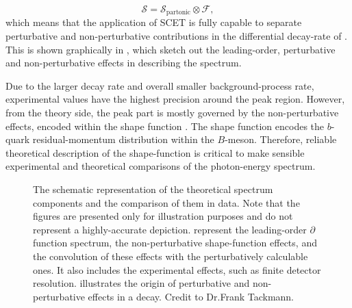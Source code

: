 \begin{equation}\label{eq:factorisation}
    \mathcal{S} = \mathcal{S}_{\mathrm{partonic}} \otimes \mathcal{F},
\end{equation}
which means that the application of SCET is fully capable to separate perturbative and non-perturbative contributions in the differential decay-rate of \BtoXsgamma.
This is shown graphically in , which sketch out the leading-order, perturbative and non-perturbative effects in describing the \BtoXsgamma spectrum.

Due to the larger \BtoXsgamma decay rate and overall smaller background-process rate, experimental values have the highest precision around the peak region.
However, from the theory side, the peak part is mostly governed by the non-perturbative effects, encoded within the shape function \cite{Ligeti:2008ac}.
The shape function encodes the $b$-quark residual-momentum distribution within the $B$-meson. 
Therefore, reliable theoretical description of the shape-function is critical to make sensible experimental and theoretical comparisons of the photon-energy spectrum. 

\begin{figure}[htbp!]
    \caption{\label{fig:xsgamma_theory_sketches} 
    The schematic representation of the theoretical \BtoXsgamma spectrum components and the comparison of them in data.
    Note that the figures are presented only for illustration purposes and do not represent a highly-accurate depiction.
     represent the leading-order $\partial$ function spectrum, the non-perturbative shape-function effects, and the convolution of these effects with the perturbatively calculable ones.
    It also includes the experimental effects, such as finite detector resolution.
     illustrates the origin of perturbative and non-perturbative effects in a \BtoXsgamma decay.
    Credit to Dr.Frank Tackmann.}
\end{figure}

